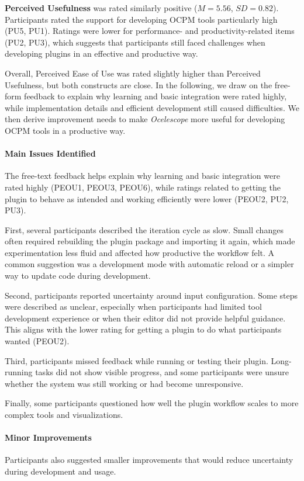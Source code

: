 \textbf{Perceived Usefulness} was rated similarly positive ($M = 5.56$, $SD = 0.82$). Participants rated the support for developing OCPM tools particularly high (PU5, PU1). Ratings were lower for performance- and productivity-related items (PU2, PU3), which suggests that participants still faced challenges when developing plugins in an effective and productive way.

Overall, Perceived Ease of Use was rated slightly higher than Perceived Usefulness, but both constructs are close.
In the following, we draw on the free-form feedback to explain why learning and basic integration were rated highly, while implementation details and efficient development still caused difficulties. We then derive improvement needs to make \textit{Ocelescope} more useful for developing OCPM tools in a productive way.

\paragraph{Main Issues Identified}
The free-text feedback helps explain why learning and basic integration were rated highly (PEOU1, PEOU3, PEOU6), while ratings related to getting the plugin to behave as intended and working efficiently were lower (PEOU2, PU2, PU3).

First, several participants described the iteration cycle as slow.
Small changes often required rebuilding the plugin package and importing it again, which made experimentation less fluid and affected how productive the workflow felt.
A common suggestion was a development mode with automatic reload or a simpler way to update code during development.

Second, participants reported uncertainty around input configuration.
Some steps were described as unclear, especially when participants had limited tool development experience or when their editor did not provide helpful guidance.
This aligns with the lower rating for getting a plugin to do what participants wanted (PEOU2).

Third, participants missed feedback while running or testing their plugin.
Long-running tasks did not show visible progress, and some participants were unsure whether the system was still working or had become unresponsive.

Finally, some participants questioned how well the plugin workflow scales to more complex tools and visualizations.

\paragraph{Minor Improvements}
Participants also suggested smaller improvements that would reduce uncertainty during development and usage.

